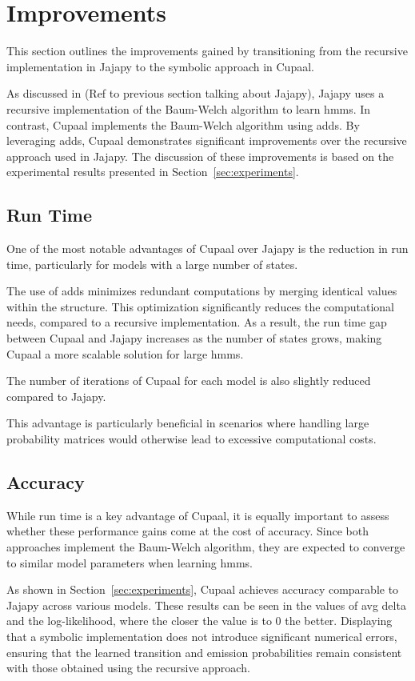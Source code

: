 \section{Improvements}\label{sec:improvements}
This section outlines the improvements gained by transitioning from the recursive implementation in Jajapy to the symbolic approach in Cupaal.

As discussed in (Ref to previous section talking about Jajapy), Jajapy uses a recursive implementation of the Baum-Welch algorithm to learn \glspl{hmm}.
In contrast, Cupaal implements the Baum-Welch algorithm using \glspl{add}.
By leveraging \glspl{add}, Cupaal demonstrates significant improvements over the recursive approach used in Jajapy.
The discussion of these improvements is based on the experimental results presented in Section~\ref{sec:experiments}.

\subsection{Run Time}\label{subsec:improvements_run_time}
One of the most notable advantages of Cupaal over Jajapy is the reduction in run time, particularly for models with a large number of states.

The use of \glspl{add} minimizes redundant computations by merging identical values within the structure.
This optimization significantly reduces the computational needs, compared to a recursive implementation.
As a result, the run time gap between Cupaal and Jajapy increases as the number of states grows, making Cupaal a more scalable solution for large \glspl{hmm}.

The number of iterations of Cupaal for each model is also slightly reduced compared to Jajapy.

This advantage is particularly beneficial in scenarios where handling large probability matrices would otherwise lead to excessive computational costs.


\subsection{Accuracy}\label{subsec:improvements_accuracy}
While run time is a key advantage of Cupaal, it is equally important to assess whether these performance gains come at the cost of accuracy.
Since both approaches implement the Baum-Welch algorithm, they are expected to converge to similar model parameters when learning \glspl{hmm}.

As shown in Section~\ref{sec:experiments}, Cupaal achieves accuracy comparable to Jajapy across various models.
These results can be seen in the values of avg delta and the log-likelihood, where the closer the value is to 0 the better.
Displaying that a symbolic implementation does not introduce significant numerical errors, ensuring that the learned transition and emission probabilities remain consistent with those obtained using the recursive approach.

